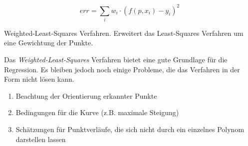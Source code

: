 \begin{ownequation}[H]
\begin{equation}
err = \sum_{i}w_i \cdot (f(p,x_i)-y_i)^2
\end{equation}
\caption[Weighted-Least-Squares-Verfahren]{Weighted-Least-Squares Verfahren. Erweitert das Least-Squares Verfahren um eine Gewichtung der Punkte.}
\label{wlsq}
\end{ownequation}
\newpage
Das \textit{Weighted-Least-Squares} Verfahren bietet eine gute Grundlage für die Regression. Es bleiben jedoch noch einige Probleme, die das Verfahren in der Form nicht lösen kann.
\begin{enumerate}
\item Beachtung der Orientierung erkannter Punkte
\item Bedingungen für die Kurve (z.B. maximale Steigung)
\item Schätzungen für Punktverläufe, die sich nicht durch ein einzelnes Polynom darstellen lassen
\end{enumerate}

